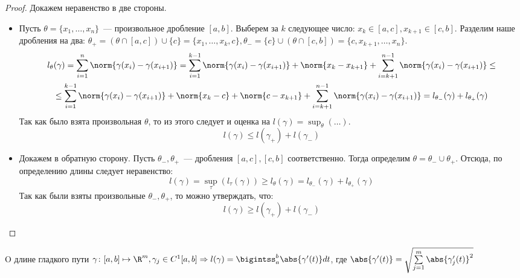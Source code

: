 \begin{proof}
    Докажем неравенство в две стороны.
    \begin{itemize}
        \item
        Пусть $\theta = \{x_1,\dots, x_n\}$~--- произвольное дробление $[a,b]$.
        Выберем за $k$ следующее число: $x_k \in [a,c], x_{k + 1}\in [c,b]$.
        Разделим наше дробления на два:
        $\theta_+ = (\theta \cap [a,c]) \cup \{c\} = \{x_1,\dots,x_k, c\},
        \theta_- = \{c\} \cup (\theta \cap [c, b]) = \{c, x_{k+1},\dots, x_n\}$.
        \[
            \begin{gathered}
                l_{\theta}(\gamma) =
                \sum\limits_{i=1}^{n}\norm{\gamma(x_i) - \gamma(x_{i + 1})}=
                \sum\limits_{i=1}^{k-1}\norm{\gamma(x_i) - \gamma(x_{i + 1})} + \norm{x_k - x_{k+1}} +
                \sum\limits_{i=k+1}^{n-1}\norm{\gamma(x_i) - \gamma(x_{i + 1})}\le\\
                \le\sum\limits_{i=1}^{k-1}\norm{\gamma(x_i) - \gamma(x_{i + 1})}
                + \norm{x_k - c} + \norm{c - x_{k + 1}} +
                \sum\limits_{i=k+1}^{n-1}\norm{\gamma(x_i) - \gamma(x_{i + 1})}=
                l_{\theta_-}(\gamma) + l_{\theta_+}(\gamma)
            \end{gathered}
        \] 
        Так как было взята произвольная $\theta$, то из этого следует и оценка на $l(\gamma) = \sup_\theta(\dots)$.
        \[
            l(\gamma) \le l(\gamma_+) + l(\gamma_-)
        \] 
        \item
        Докажем в обратную сторону.
        Пусть $\theta_-, \theta_+$~--- дробления $[a,c], [c, b]$ соответственно.
        Тогда определим $\theta = \theta_- \cup \theta_+$. Отсюда, по определению длины следует неравенство:
         \[
             l(\gamma) = \sup_{\tau}(l_{\tau}(\gamma)) \ge l_{\theta}(\gamma) = l_{\theta_-}(\gamma) + l_{\theta_+}(\gamma)
        \] 
        Так как были взяты произвольные $\theta_-, \theta_+$, то можно утверждать, что:
         \[
             l(\gamma) \ge l(\gamma_+) + l(\gamma_-)
        \] 
    \end{itemize}
\end{proof}
\begin{namedtheorem}{O длине гладкого пути}
    $\gamma\colon[a,b]\mapsto\R^m, \gamma_j\in C^1[a,b] \Rightarrow 
    l(\gamma)=\bigintss_{a}^{b}\abs{\gamma'(t)}dt$, где
    $\abs{\gamma'(t)} = \sqrt{\sum\limits_{j=1}^{m}{\abs{\gamma'_j(t)}}^2}$
\end{namedtheorem}
